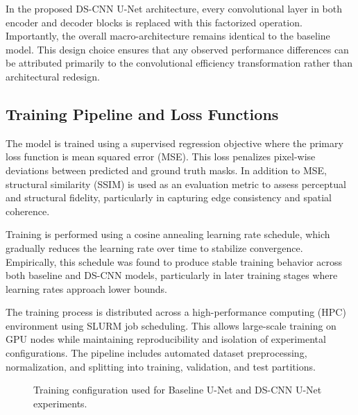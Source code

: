 \documentclass[conference]{IEEEtran}
\begin{document}
In the proposed DS-CNN U-Net architecture, every convolutional layer in both encoder and decoder blocks is replaced with this factorized operation. Importantly, the overall macro-architecture remains identical to the baseline model. This design choice ensures that any observed performance differences can be attributed primarily to the convolutional efficiency transformation rather than architectural redesign.

\subsection{\textbf{Training Pipeline and Loss Functions}}

The model is trained using a supervised regression objective where the primary loss function is mean squared error (MSE). This loss penalizes pixel-wise deviations between predicted and ground truth masks. In addition to MSE, structural similarity (SSIM) is used as an evaluation metric to assess perceptual and structural fidelity, particularly in capturing edge consistency and spatial coherence.

Training is performed using a cosine annealing learning rate schedule, which gradually reduces the learning rate over time to stabilize convergence. Empirically, this schedule was found to produce stable training behavior across both baseline and DS-CNN models, particularly in later training stages where learning rates approach lower bounds.

The training process is distributed across a high-performance computing (HPC) environment using SLURM job scheduling. This allows large-scale training on GPU nodes while maintaining reproducibility and isolation of experimental configurations. The pipeline includes automated dataset preprocessing, normalization, and splitting into training, validation, and test partitions.


\begin{figure}[!t]
\centering
{}
\caption{Training configuration used for Baseline U-Net and DS-CNN U-Net experiments.}
\label{fig:training_config}
\end{figure}
\end{document}
